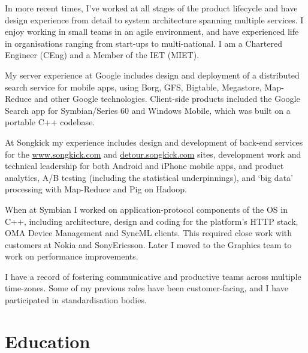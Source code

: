 \documentclass[margin = 0cm,line]{resume}
\begin{document}
\begin{resume}
    In more recent times, I've worked at all stages of the product lifecycle and have design experience from detail to
    system architecture spanning multiple services. I enjoy working in small teams in an agile environment, and have
    experienced life in organisations ranging from start-ups to multi-national.  I am a Chartered Engineer (CEng) and a
    Member of the IET (MIET).

    My server experience at Google includes design and deployment of a distributed search service for mobile apps,
    using Borg, GFS, Bigtable, Megastore, Map-Reduce and other Google technologies.  Client-side products included
    the Google Search app for Symbian/Series 60 and Windows Mobile, which was built on a portable C++ codebase.

    At Songkick my experience includes design and development of back-end services for the \url{www.songkick.com} and
    \url{detour.songkick.com} sites, development work and technical leadership for both Android and iPhone mobile apps,
    and product analytics, A/B testing (including the statistical underpinnings), and `big data' processing with
    Map-Reduce and Pig on Hadoop.

    When at Symbian I worked on application-protocol components of the OS in C++, including architecture, design and
    coding for the platform's HTTP stack, OMA Device Management and SyncML clients. This required close work with
    customers at Nokia and SonyEricsson.  Later I moved to the Graphics team to work on performance improvements.

    I have a record of fostering communicative and productive teams across multiple time-zones.  Some of my previous
    roles have been customer-facing, and I have participated in standardisation bodies.

    \section{\mysidestyle Education}


\end{resume}
\end{document}
